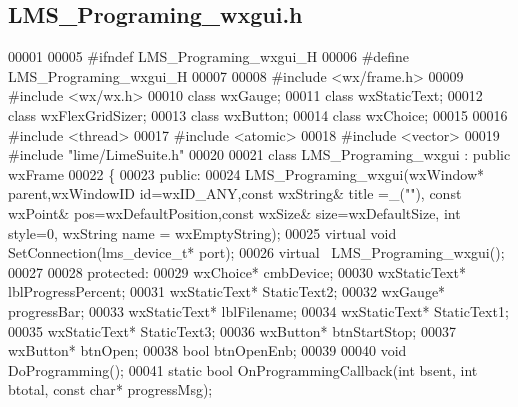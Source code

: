 \subsection{L\+M\+S\+\_\+\+Programing\+\_\+wxgui.\+h}
\label{LMS__Programing__wxgui_8h_source}

\begin{DoxyCode}
00001 
00005 \textcolor{preprocessor}{#ifndef LMS\_Programing\_wxgui\_H}
00006 \textcolor{preprocessor}{#define LMS\_Programing\_wxgui\_H}
00007 
00008 \textcolor{preprocessor}{#include <wx/frame.h>}
00009 \textcolor{preprocessor}{#include <wx/wx.h>}
00010 \textcolor{keyword}{class }wxGauge;
00011 \textcolor{keyword}{class }wxStaticText;
00012 \textcolor{keyword}{class }wxFlexGridSizer;
00013 \textcolor{keyword}{class }wxButton;
00014 \textcolor{keyword}{class }wxChoice;
00015 
00016 \textcolor{preprocessor}{#include <thread>}
00017 \textcolor{preprocessor}{#include <atomic>}
00018 \textcolor{preprocessor}{#include <vector>}
00019 \textcolor{preprocessor}{#include "lime/LimeSuite.h"}
00020 
00021 \textcolor{keyword}{class }LMS_Programing_wxgui : \textcolor{keyword}{public} wxFrame
00022 \{
00023 \textcolor{keyword}{public}:
00024     LMS_Programing_wxgui(wxWindow* parent,wxWindowID \textcolor{keywordtype}{id}=wxID\_ANY,\textcolor{keyword}{const} wxString& title =\_(\textcolor{stringliteral}{""}), \textcolor{keyword}{const} 
      wxPoint& pos=wxDefaultPosition,\textcolor{keyword}{const} wxSize& size=wxDefaultSize, \textcolor{keywordtype}{int} style=0, wxString 
      name = wxEmptyString);
00025     \textcolor{keyword}{virtual} \textcolor{keywordtype}{void} SetConnection(lms_device_t* port);
00026     \textcolor{keyword}{virtual} ~LMS_Programing_wxgui();
00027 
00028 \textcolor{keyword}{protected}:
00029     wxChoice* cmbDevice;
00030     wxStaticText* lblProgressPercent;
00031     wxStaticText* StaticText2;
00032     wxGauge* progressBar;
00033     wxStaticText* lblFilename;
00034     wxStaticText* StaticText1;
00035     wxStaticText* StaticText3;
00036     wxButton* btnStartStop;
00037     wxButton* btnOpen;
00038     \textcolor{keywordtype}{bool} btnOpenEnb;
00039 
00040     \textcolor{keywordtype}{void} DoProgramming();
00041     \textcolor{keyword}{static} \textcolor{keywordtype}{bool} OnProgrammingCallback(\textcolor{keywordtype}{int} bsent, \textcolor{keywordtype}{int} btotal, \textcolor{keyword}{const} \textcolor{keywordtype}{char}* progressMsg);

\end{DoxyCode}
